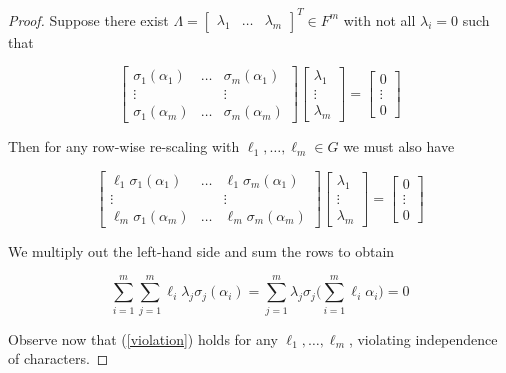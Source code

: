 \documentclass[sigconf]{acmart}
\begin{document}
\begin{proof}
Suppose there exist $\Lambda = \begin{bmatrix} \lambda_1 &  \ldots & \lambda_m \end{bmatrix}^T \in F^m$ with not all $\lambda_i = 0$ such that

\begin{equation*}
 \begin{bmatrix}
\sigma_1(\alpha_1) & \ldots & \sigma_m(\alpha_1) \\ \vdots & & \vdots \\ \sigma_1(\alpha_m) & \ldots & \sigma_m(\alpha_m) \end{bmatrix} \begin{bmatrix} \lambda_1 \\ \vdots \\ \lambda_m \end{bmatrix} = \begin{bmatrix}
0 \\ \vdots \\ 0
\end{bmatrix}
\end{equation*}

Then for any row-wise re-scaling with $\ell_1, \ldots, \ell_m \in G$ we must also have

\begin{equation*}
 \begin{bmatrix}
\ell_1\sigma_1(\alpha_1) & \ldots & \ell_1\sigma_m(\alpha_1) \\ \vdots & & \vdots \\ \ell_m\sigma_1(\alpha_m) & \ldots & \ell_m\sigma_m(\alpha_m) \end{bmatrix} \begin{bmatrix} \lambda_1 \\ \vdots \\ \lambda_m \end{bmatrix} = \begin{bmatrix}
0 \\ \vdots \\ 0
\end{bmatrix}
\end{equation*}

We multiply out the left-hand side and sum the rows to obtain

\begin{equation}\label{violation}
    \sum_{i=1}^m\sum_{j=1}^m\ell_i\lambda_j\sigma_j(\alpha_i) = \sum_{j=1}^m\lambda_j\sigma_j\bigg(\sum_{i=1}^m\ell_i\alpha_i\bigg)  = 0
\end{equation}

Observe now that (\ref{violation}) holds for any $\ell_1, \ldots, \ell_m $, violating independence of characters.

\end{proof}
\end{document}
